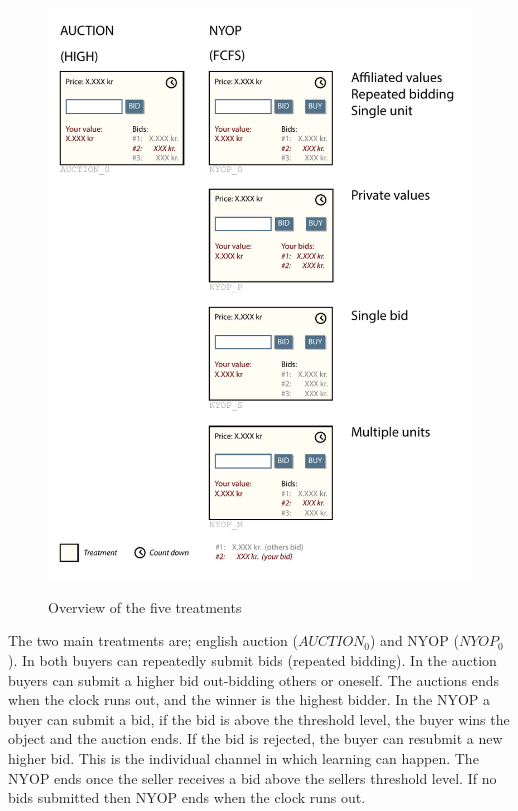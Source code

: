\documentclass[a4paper,12pt]{article}
\begin{document}
	\begin{figure}
	        \centering
	        \caption{ Overview of the five treatments}
	        \includegraphics[width=\textwidth]{Figures/Treatments}
			\label{fig:treatments}
	\end{figure}

	The two main treatments are; english auction ($AUCTION_0$) and NYOP ($NYOP_0$). 
	In both buyers can repeatedly submit bids (repeated bidding). In the auction buyers can submit a higher bid out-bidding others or oneself. The auctions ends when the clock runs out, and the winner is the highest bidder. In the NYOP a buyer can submit a bid, if the bid is above the threshold level, the buyer wins the object and the auction ends. If the bid is rejected, the buyer can resubmit a new higher bid. This is the individual channel in which learning can happen. The NYOP ends once the seller receives a bid above the sellers threshold level. If no bids submitted then NYOP ends when the clock runs out.
\end{document}
